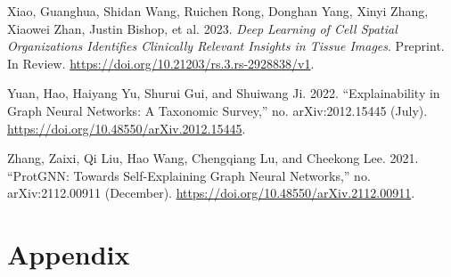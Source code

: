 \documentclass[
  11pt,
  letterpaper,
]{article}
\newlength{\cslhangindent}
\newlength{\cslentryspacingunit} %
\newenvironment{CSLReferences}[2] %
 {%
  \setlength{\parindent}{0pt}
  \ifodd #1
  \let\oldpar\par
  \def\par{\hangindent=\cslhangindent\oldpar}
  \fi
  \setlength{\parskip}{#2\cslentryspacingunit}
 }%
 {}
\begin{document}
\begin{CSLReferences}{1}{0}
\leavevmode{}%
Xiao, Guanghua, Shidan Wang, Ruichen Rong, Donghan Yang, Xinyi Zhang,
Xiaowei Zhan, Justin Bishop, et al. 2023. \emph{Deep Learning of Cell
Spatial Organizations Identifies Clinically Relevant Insights in Tissue
Images}. Preprint. In Review.
\url{https://doi.org/10.21203/rs.3.rs-2928838/v1}.

\leavevmode{}%
Yuan, Hao, Haiyang Yu, Shurui Gui, and Shuiwang Ji. 2022.
{``Explainability in Graph Neural Networks: A Taxonomic Survey,''} no.
arXiv:2012.15445 (July).
\url{https://doi.org/10.48550/arXiv.2012.15445}.

\leavevmode{}%
Zhang, Zaixi, Qi Liu, Hao Wang, Chengqiang Lu, and Cheekong Lee. 2021.
{``ProtGNN: Towards Self-Explaining Graph Neural Networks,''} no.
arXiv:2112.00911 (December).
\url{https://doi.org/10.48550/arXiv.2112.00911}.

\end{CSLReferences}

\hypertarget{appendix}{%
\section{Appendix}\label{appendix}}
\end{document}
